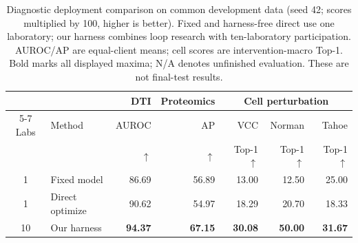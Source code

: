 \begin{table}[t]
\centering\small
\setlength{\tabcolsep}{4pt}
\begin{tabular}{clrrrrr}
\toprule
 & & DTI & Proteomics & \multicolumn{3}{c}{Cell perturbation} \\
\cmidrule(lr){5-7}
Labs & Method & AUROC & AP & VCC & Norman & Tahoe \\
 & & $\uparrow$ & $\uparrow$ & Top-1 $\uparrow$ & Top-1 $\uparrow$ & Top-1 $\uparrow$ \\
\midrule
1 & Fixed model & 86.69 & 56.89 & 13.00 & 12.50 & 25.00 \\
1 & Direct optimize & 90.62 & 54.97 & 18.29 & 20.70 & 18.33 \\
10 & Our harness & \textbf{94.37} & \textbf{67.15} & \textbf{30.08} & \textbf{50.00} & \textbf{31.67} \\
\bottomrule
\end{tabular}
\caption{Diagnostic deployment comparison on common development data (seed 42; scores multiplied by 100, higher is better). Fixed and harness-free direct use one laboratory; our harness combines loop research with ten-laboratory participation. AUROC/AP are equal-client means; cell scores are intervention-macro Top-1. Bold marks all displayed maxima; N/A denotes unfinished evaluation. These are not final-test results.}
\label{tab:unified-development}
\end{table}
